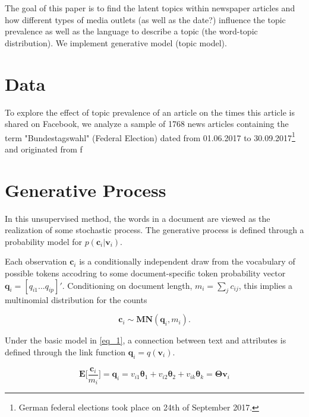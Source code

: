 \documentclass[12pt,a4paper,notitlepage]{article}
\begin{document}
The goal of this paper is to find the latent topics within newspaper articles and how different types of media outlets (as well as the date?) influence the topic prevalence as well as the language to describe a topic (the word-topic distribution). We implement generative model (topic model). 



\section{Data}

To explore the effect of topic prevalence of an article on the times this article is shared on Facebook, we analyze a sample of 1768 news articles containing the term "Bundestagswahl" (Federal Election) dated from 01.06.2017 to 30.09.2017\footnote{German federal elections took place on 24th of September 2017.} and originated from f


\section{Generative Process}

In this unsupervised method, the words in a document are viewed as the realization of some stochastic process. The generative process is defined through a probability model for $p(\boldsymbol{c}_i|\boldsymbol{v}_i)$.

Each observation $\boldsymbol{c}_i$ is a conditionally independent draw from the vocabulary of possible tokens accodring to some document-specific token probability vector $\boldsymbol{q}_i=[q_{i1}...q_{ip}]'$. Conditioning on document length, $m_i=\sum_jc_{ij}$, this implies a multinomial distribution for the counts

\begin{equation}\label{eq_1}
	\boldsymbol{c}_i \sim \boldsymbol{MN}(\boldsymbol{q}_i,m_i). 
\end{equation}

Under the basic model in \ref{eq_1}, a connection between text and attributes is defined through the link function $\boldsymbol{q}_i=q(\boldsymbol{v}_i)$. 

\begin{equation}\label{eq_2}
	\boldsymbol{E} \bigg[\frac{\boldsymbol{c}_i}{m_i}\bigg]=\boldsymbol{q}_i =v_{i1}\boldsymbol{\theta}_1+v_{i2}\boldsymbol{\theta}_2+v_{ik}\boldsymbol{\theta}_k=\boldsymbol{\Theta v}_i
\end{equation}
\end{document}
